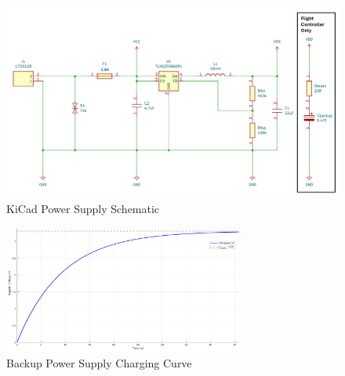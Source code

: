 \begin{figure}[ht]
  \centering
  \includegraphics[width=\textwidth]{figs/Thomas/Custom Hardware/Power Supply.png}
  \caption{KiCad Power Supply Schematic}
  \label{fig:power_supply_schematic}
\end{figure}

\begin{figure}[ht]
  \centering  \includegraphics[width=0.7\textwidth]{figs/Thomas/Custom Hardware/charging_curve.png}
  \caption{Backup Power Supply Charging Curve}
  \label{fig:charging_curve}
\end{figure}

